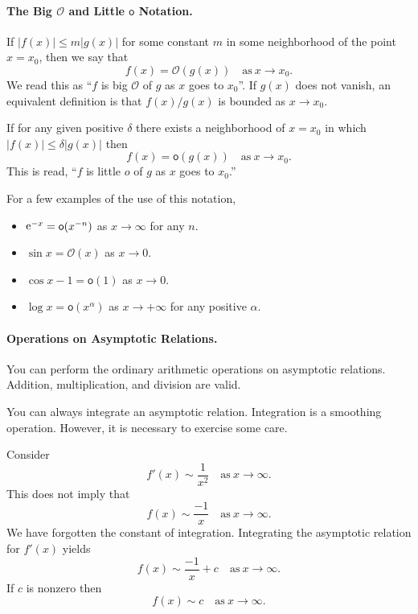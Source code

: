 \paragraph{The Big $\mathbf{\mathcal{O}}$ and Little $\mathbf{\mathsf{o}}$ 
  Notation.}
If $|f(x)| \leq m |g(x)|$ for some constant $m$ in some 
neighborhood of the point $x = x_0$, then we say that
\[ f(x) = \mathcal{O}(g(x)) \quad \mathrm{as}\ x \to x_0.\]
We read this as ``$f$ is big $\mathcal{O}$ of $g$ as $x$ goes to $x_0$''.
If $g(x)$ does not vanish, an equivalent definition is that
$f(x) / g(x)$ is bounded as $x \to x_0$.

If for any given positive $\delta$ there exists a neighborhood of $x=x_0$
in which $|f(x)| \leq \delta |g(x)|$ then 
\[ f(x) = \mathsf{o}(g(x)) \quad \mathrm{as}\ x \to x_0.\]
This is read, ``$f$ is little $o$ of $g$ as $x$ goes to $x_0$.''

For a few examples of the use of this notation,
\begin{itemize}
\item $ \mathop{\mathrm{e}}\nolimits^{-x} = \mathsf{o}(x^{-n})$ as $x \to \infty$ for any $n$. 
\item $\sin x = \mathcal{O}(x)$ as $x \to 0$.
\item $\cos x - 1 = \mathsf{o}(1)$ as $x \to 0$.
\item $\log x = \mathsf{o}(x^\alpha)$ as $x \to +\infty$ 
  for any positive $\alpha$.
\end{itemize}



\paragraph{Operations on Asymptotic Relations.}
You can perform the ordinary arithmetic operations on asymptotic relations.
Addition, multiplication, and division are valid.

You can always integrate an asymptotic relation.  Integration is a smoothing
operation.  However, it is necessary to exercise some care.




\begin{Example}
  Consider 
  \[ f'(x) \sim \frac{1}{x^2} \quad \mathrm{as}\ x \to \infty.\]
  This does not imply that
  \[ f(x) \sim \frac{-1}{x} \quad \mathrm{as}\ x \to \infty.\]
  We have forgotten the constant of integration. Integrating the 
  asymptotic relation for $f'(x)$ yields
  \[ f(x) \sim \frac{-1}{x} + c \quad \mathrm{as}\ x \to \infty. \]
  If $c$ is nonzero then
  \[ f(x) \sim c \quad \mathrm{as}\ x \to \infty. \]
\end{Example}


